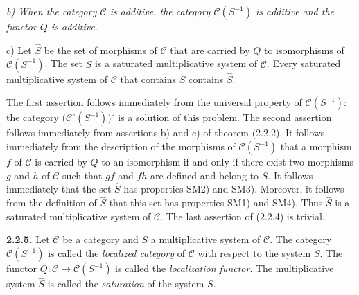 \clearpage
{}%
\begingroup
\small
\setlength{\emergencystretch}{2em}%
\setlength{\parskip}{0pt}%
\setlength{\abovedisplayskip}{1pt plus 1pt minus 1pt}%
\setlength{\belowdisplayskip}{1pt plus 1pt minus 1pt}%

\begingroup\itshape
{}
\noindent b) When the category $\mathcal C$ is additive, the category
$\mathcal C(S^{-1})$ is additive and the functor $Q$ is additive.

\par\noindent c) Let $\widehat S$ be the set of morphisms of $\mathcal C$
that are carried by $Q$ to isomorphisms of $\mathcal C(S^{-1})$.
%
The set $\widehat S$ is a saturated multiplicative system of $\mathcal C$.
Every saturated multiplicative system of $\mathcal C$ that contains $S$
contains $\widehat S$.
\endgroup

\par\noindent The first assertion follows immediately from the universal
property of $\mathcal C(S^{-1})$: the category
$\bigl(\mathcal C^\circ(S^{-1})\bigr)^\circ$ is a solution of this problem.
The second assertion follows immediately from assertions b) and c) of
theorem (2.2.2).
%
It follows immediately from the description of the morphisms of
$\mathcal C(S^{-1})$ that a morphism $f$ of $\mathcal C$ is carried by $Q$
to an isomorphism if and only if there exist two morphisms $g$ and $h$ of
$\mathcal C$ such that $gf$ and $fh$ are defined and belong to $S$.
%
It follows immediately that the set $\widehat S$ has properties SM2) and
SM3).
%
Moreover, it follows from the definition of $\widehat S$ that this set has
properties SM1) and SM4).
%
Thus $\widehat S$ is a saturated multiplicative system of $\mathcal C$.
The last assertion of (2.2.4) is trivial.

\smallskip
\noindent\textbf{2.2.5.} Let $\mathcal C$ be a category and $S$ a
multiplicative system of $\mathcal C$.
%
The category $\mathcal C(S^{-1})$ is called the \emph{localized category}
of $\mathcal C$ with respect to the system $S$.
%
The functor $Q\colon\mathcal C\longrightarrow\mathcal C(S^{-1})$ is called
the \emph{localization functor}.
%
The multiplicative system $\widehat S$ is called the \emph{saturation} of
the system $S$.

